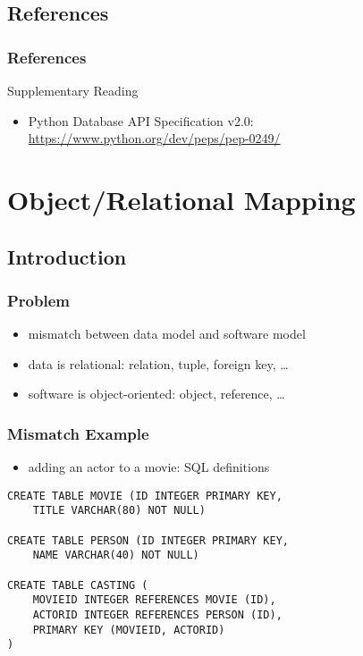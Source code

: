 \documentclass[dvipsnames]{beamer}
\theoremstyle{plain}
\begin{document}
\subsection*{References}

\begin{frame}
  \frametitle{References}

  \begin{block}{Supplementary Reading}
    \begin{itemize}
      \item Python Database API Specification v2.0:\\
        \url{https://www.python.org/dev/peps/pep-0249/}
    \end{itemize}
  \end{block}
\end{frame}

\section{Object/Relational Mapping}

\subsection{Introduction}

\begin{frame}
  \frametitle{Problem}

  \begin{itemize}
    \item mismatch between data model and software model

    \medskip
    \item data is relational: relation, tuple, foreign key, \ldots
    \item software is object-oriented: object, reference, \ldots
  \end{itemize}
\end{frame}

\begin{frame}[fragile]
  \frametitle{Mismatch Example}

  \begin{itemize}
    \item adding an actor to a movie: SQL definitions
  \end{itemize}

  \begin{lstlisting}[language=FullSQL]
CREATE TABLE MOVIE (ID INTEGER PRIMARY KEY,
    TITLE VARCHAR(80) NOT NULL)

CREATE TABLE PERSON (ID INTEGER PRIMARY KEY,
    NAME VARCHAR(40) NOT NULL)

CREATE TABLE CASTING (
    MOVIEID INTEGER REFERENCES MOVIE (ID),
    ACTORID INTEGER REFERENCES PERSON (ID),
    PRIMARY KEY (MOVIEID, ACTORID)
)
  \end{lstlisting}
\end{frame}
\end{document}
